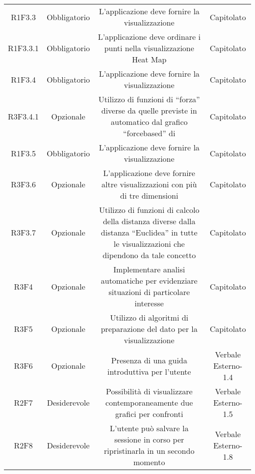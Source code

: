 \begin{center}
\begin{longtable}{C{\colA} C{\colB} C{\colC} C{\colA}}
R1F3.3 & Obbligatorio & L'applicazione deve fornire la visualizzazione  & Capitolato\\
R1F3.3.1 & Obbligatorio & L'applicazione deve ordinare i punti nella visualizzazione Heat Map & Capitolato \\
R1F3.4 & Obbligatorio & L'applicazione deve fornire la visualizzazione  & Capitolato\\
R3F3.4.1 & Opzionale & Utilizzo di funzioni di “forza” diverse da quelle previste in automatico dal grafico “forcebased” di  & Capitolato\\
R1F3.5 & Obbligatorio & L'applicazione deve fornire la visualizzazione  & Capitolato \\
R3F3.6 & Opzionale & L'applicazione deve fornire altre visualizzazioni con più di tre dimensioni & Capitolato\\
R3F3.7 & Opzionale & Utilizzo di funzioni di calcolo della distanza diverse dalla distanza “Euclidea” in tutte le visualizzazioni che dipendono da tale concetto & Capitolato \\
R3F4 & Opzionale & Implementare analisi automatiche per evidenziare situazioni di particolare interesse & Capitolato\\
R3F5 & Opzionale & Utilizzo di algoritmi di preparazione del dato per la visualizzazione & Capitolato\\
R3F6 & Opzionale & Presenza di una guida introduttiva per l'utente & Verbale Esterno-1.4\\
R2F7 & Desiderevole & Possibilità di visualizzare contemporaneamente due grafici per confronti & Verbale Esterno-1.5\\
R2F8 & Desiderevole & L'utente può salvare la sessione in corso per ripristinarla in un secondo momento & Verbale Esterno-1.8\\


\end{longtable}
\end{center}



